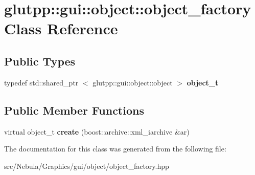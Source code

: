 \hypertarget{classglutpp_1_1gui_1_1object_1_1object__factory}{\section{glutpp\-:\-:gui\-:\-:object\-:\-:object\-\_\-factory \-Class \-Reference}
\label{classglutpp_1_1gui_1_1object_1_1object__factory}
}
\subsection*{\-Public \-Types}
\begin{DoxyCompactItemize}
\item 
\hypertarget{classglutpp_1_1gui_1_1object_1_1object__factory_a4a6e3b986deecc14be3b9f2f15dbd6f2}{typedef std\-::shared\-\_\-ptr\*
$<$ glutpp\-::gui\-::object\-::object $>$ {\bfseries object\-\_\-t}}\label{classglutpp_1_1gui_1_1object_1_1object__factory_a4a6e3b986deecc14be3b9f2f15dbd6f2}

\end{DoxyCompactItemize}
\subsection*{\-Public \-Member \-Functions}
\begin{DoxyCompactItemize}
\item 
\hypertarget{classglutpp_1_1gui_1_1object_1_1object__factory_a00a2712a917a187ad3acd41132db8611}{virtual object\-\_\-t {\bfseries create} (boost\-::archive\-::xml\-\_\-iarchive \&ar)}\label{classglutpp_1_1gui_1_1object_1_1object__factory_a00a2712a917a187ad3acd41132db8611}

\end{DoxyCompactItemize}


\-The documentation for this class was generated from the following file\-:\begin{DoxyCompactItemize}
\item 
src/\-Nebula/\-Graphics/gui/object/object\-\_\-factory.\-hpp\end{DoxyCompactItemize}
